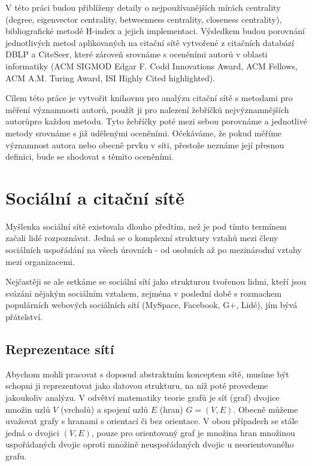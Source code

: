 \documentclass{bakalarka}
\begin{document}
V této práci budou přiblíženy detaily o nejpoužívanějších mírách centrality
(degree, eigenvector centrality, betweenness centrality, closeness centrality),
bibliografické metodě H-index a jejich implementaci. Výsledkem budou porovnání
jednotlivých metod aplikovaných na citační sítě vytvořené z citačních databází
DBLP a CiteSeer, které zároveň srovnáme s oceněními autorů v oblasti
informatiky (ACM SIGMOD Edgar F. Codd Innovations Award, ACM Fellows, ACM A.M.
Turing Award, ISI Highly Cited highlighted).

Cílem této práce je vytvořit knihovnu pro analýzu citační sítě s metodami pro
měření významnosti autorů, použít ji pro nalezení žebříčků nejvýznamnějších
autorůpro každou metodu. Tyto žebříčky poté mezi sebou porovnáme a jednotlivé
metody srovnáme s již udělenými oceněními. Očekáváme, že pokud měříme
významnost autora nebo obecně prvku v síti, přestože neznáme její přesnou
definici, bude se shodovat s těmito oceněními.


\chapter{Sociální a citační sítě}
Myšlenka sociální sítě existovala dlouho předtím, než je pod tímto termínem
začali lidé rozpoznávat. Jedná se o komplexní struktury vztahů mezi členy
sociálních uspořádání na všech úrovních - od osobních až po mezinárodní vztahy
mezi organizacemi.

Nejčastěji se ale setkáme se sociální sítí jako strukturou tvořenou lidmi,
kteří jsou svázáni nějakým sociálním vztahem, zejména v poslední době s
rozmachem populárních webových sociálních sítí (MySpace, Facebook, G+, Lidé),
jím bývá přátelství.

\section{Reprezentace sítí}
Abychom mohli pracovat s doposud abstraktním konceptem sítě, musíme být schopni
ji reprezentovat jako datovou strukturu, na níž poté provedeme jakoukoliv
analýzu.
V odvětví matematiky teorie grafů je síť (graf) dvojice množin uzlů $V$
(vrcholů) a spojení uzlů $E$ (hran) $G = (V, E)$.  Obecně můžeme uvažovat grafy
s hranami s orientací či bez orientace. V obou případech se stále jedná o
dvojici $(V, E)$, pouze pro orientovaný graf je množina hran množinou
uspořádaných dvojic oproti množině neuspořádaných dvojic u neorientovaného
grafu.
\end{document}
